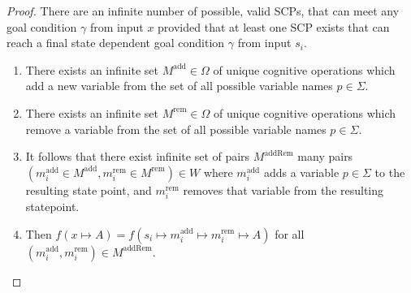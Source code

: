 \begin{proof} \label{proof:infiniteSCPs}
There are an infinite number of possible, valid SCPs, that can meet any goal condition $\gamma$ from input $x$ provided that at least one SCP exists that can reach a final state dependent goal condition $\gamma$ from input $s_i$.
\begin{enumerate}
\item There exists an infinite set  $M^\text{add} \in \Omega$ of unique cognitive operations which add a new variable from the set of all possible variable names $p \in \Sigma$.
\item There exists an infinite set $M^\text{rem} \in \Omega$ of unique cognitive operations  which remove a variable from the set of all possible variable names  $p \in \Sigma$.
\item It follows that there exist infinite set of pairs $M^\text{addRem}$ many pairs $(m^\text{add}_i \in M^\text{add}, m^\text{rem}_i \in M^\text{rem}) \in W$ where $m^\text{add}_i$ adds a variable $p \in \Sigma$ to the resulting state point, and $m^\text{rem}_i$ removes that variable from the resulting statepoint.
\item Then $f(x \longmapsto A) = f(s_i \longmapsto m^\text{add}_i \longmapsto m^\text{rem}_i \longmapsto A)$ for all $(m^\text{add}_i, m^\text{rem}_i) \in M^\text{addRem}$.
\end{enumerate}
\end{proof}






















